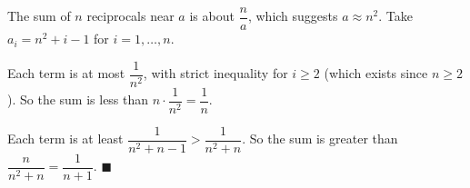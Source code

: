 The sum of $n$ reciprocals near $a$ is about $\dfrac na$, which suggests $a\approx n^2$. Take $a_i=n^2+i-1$ for $i=1,\dots,n$.

Each term is at most $\dfrac{1}{n^2}$, with strict inequality for $i\ge2$ (which exists since $n\ge2$). So the sum is less than $n\cdot\dfrac{1}{n^2}=\dfrac1n$.

Each term is at least $\dfrac{1}{n^2+n-1}>\dfrac{1}{n^2+n}$. So the sum is greater than $\dfrac{n}{n^2+n}=\dfrac{1}{n+1}$. $\blacksquare$
